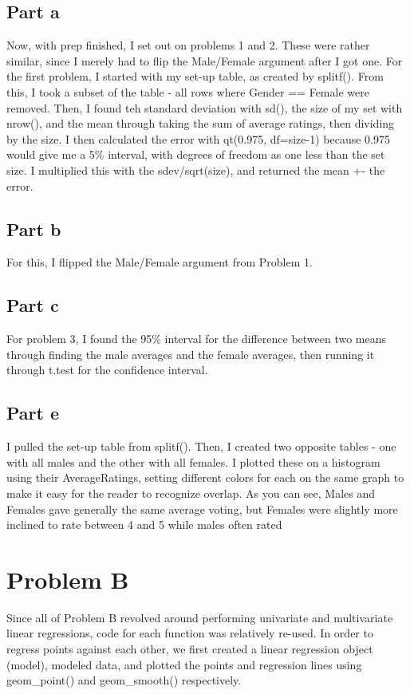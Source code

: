 \documentclass{article}
\begin{document}
  \subsection*{Part a}
    Now, with prep finished, I set out on problems 1 and 2. These were rather similar,
    since I merely had to flip the Male/Female argument after I got one. For the first problem, 
    I started with my set-up table, as created by splitf(). From this,
    I took a subset of the table - all rows where Gender == Female were removed.
    Then, I found teh standard deviation with sd(), the size of my set with nrow(),
    and the mean through taking the sum of average ratings, then dividing by the size. 
    I then calculated the error with qt(0.975, df=size-1) because 0.975 would give
    me a 5\% interval, with degrees of freedom as one less than the set size.
    I multiplied this with the sdev/sqrt(size), and returned the mean +- the error.
  \subsection*{Part b}
    For this, I flipped the Male/Female argument from Problem 1.
  \subsection*{Part c}
    For problem 3, I found the 95\% interval for the difference between two means
    through finding the male averages and the female averages, then running it through
    t.test for the confidence interval.
  \subsection*{Part e}
    I pulled the set-up table from splitf(). Then, I created two opposite tables - one with
    all males and the other with all females. I plotted these on a histogram using
    their AverageRatings, setting different colors for each on the same graph
    to make it easy for the reader to recognize overlap. 
    \newline As you can see, Males and Females gave generally the same average voting, but
    Females were slightly more inclined to rate between 4 and 5 while males often rated
  \section*{Problem B}
    Since all of Problem B revolved around performing univariate and multivariate linear regressions, code for each function was relatively re-used. In order to regress points against each other, we first created a linear regression object (model), modeled data, and plotted the points and regression lines using geom\_point() and geom\_smooth() respectively.
\end{document}

